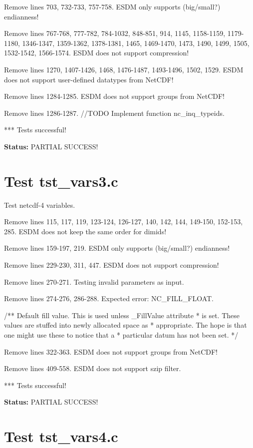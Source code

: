 Remove lines 703, 732-733, 757-758. ESDM only supports (big/small?) endianness!

Remove lines 767-768, 777-782, 784-1032, 848-851, 914, 1145, 1158-1159, 1179-1180, 1346-1347, 1359-1362, 1378-1381, 1465, 1469-1470, 1473, 1490, 1499, 1505, 1532-1542, 1566-1574. ESDM does not support compression!

Remove lines 1270, 1407-1426, 1468, 1476-1487, 1493-1496, 1502, 1529. ESDM does not support user-defined datatypes from NetCDF!

Remove lines 1284-1285. ESDM does not support groups from NetCDF!

Remove lines 1286-1287. //TODO Implement function nc\_inq\_typeids.

*** Tests successful!

{\bf \large Status: } PARTIAL SUCCESS!

\section{Test tst\_vars3.c}

Test netcdf-4 variables.

Remove lines 115, 117, 119, 123-124, 126-127, 140, 142, 144, 149-150, 152-153, 285. ESDM does not keep the same order for dimids!

Remove lines 159-197, 219. ESDM only supports (big/small?) endianness!

Remove lines 229-230, 311, 447. ESDM does not support compression!

Remove lines 270-271. Testing invalid parameters as input.

Remove lines 274-276, 286-288. Expected error: NC\_FILL\_FLOAT.

/** Default fill value. This is used unless \_FillValue attribute
 * is set.  These values are stuffed into newly allocated space as
 * appropriate.  The hope is that one might use these to notice that a
 * particular datum has not been set. */

Remove lines 322-363. ESDM does not support groups from NetCDF!

Remove lines 409-558. ESDM does not support szip filter.

*** Tests successful!

{\bf \large Status: } PARTIAL SUCCESS!

\section{Test tst\_vars4.c}


